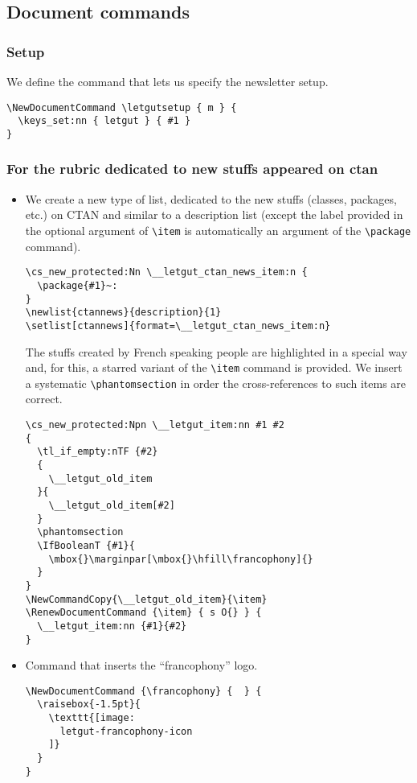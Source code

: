 \documentclass{letgut}
\begin{document}
\subsection{Document commands}
\label{ImplementationDocumentcommands-s1qg55h0jlj0}
\subsubsection{Setup}
\label{ImplementationDocumentcommandsSetup-roqg55h0jlj0}
We define the command that lets us specify the newsletter setup.

\begin{lstlisting}
\NewDocumentCommand \letgutsetup { m } {
  \keys_set:nn { letgut } { #1 }
}
\end{lstlisting}

\subsubsection{For the rubric dedicated to new stuffs appeared on \acs{ctan}}
\label{ImplementationDocumentcommandsFortherubricdedicatedtonewstuffsappearedonacsctan-jerg55h0jlj0}
\begin{itemize}
\item We create a new type of list, dedicated to the new stuffs (classes, packages,
etc.) on CTAN and similar to a description list (except the label provided in
the optional argument of \lstinline+\item+ is automatically an argument of the
\lstinline+\package+ command).
\begin{lstlisting}
\cs_new_protected:Nn \__letgut_ctan_news_item:n {
  \package{#1}~:
}
\newlist{ctannews}{description}{1}
\setlist[ctannews]{format=\__letgut_ctan_news_item:n}
\end{lstlisting}
The stuffs created by French speaking people are highlighted in a special
way and, for this, a starred variant of the \lstinline+\item+ command is provided. We
insert a systematic \lstinline+\phantomsection+ in order the cross-references to such
items are correct.
\begin{lstlisting}
\cs_new_protected:Npn \__letgut_item:nn #1 #2
{
  \tl_if_empty:nTF {#2}
  {
    \__letgut_old_item
  }{
    \__letgut_old_item[#2]
  }
  \phantomsection
  \IfBooleanT {#1}{
    \mbox{}\marginpar[\mbox{}\hfill\francophony]{}
  }
}
\NewCommandCopy{\__letgut_old_item}{\item}
\RenewDocumentCommand {\item} { s O{} } {
  \__letgut_item:nn {#1}{#2}
}
\end{lstlisting}
\end{itemize}
\begin{itemize}
\item Command that inserts the \enquote{francophony} logo.
\begin{lstlisting}
\NewDocumentCommand {\francophony} {  } {
  \raisebox{-1.5pt}{
    \texttt{[image: 
      letgut-francophony-icon
    ]}
  }
}
\end{lstlisting}
\end{itemize}
\end{document}
